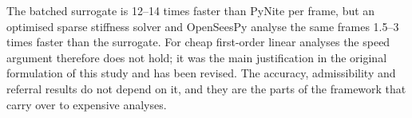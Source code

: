 The batched surrogate is 12--14 times faster than PyNite per frame, but an optimised sparse stiffness solver and OpenSeesPy analyse the same frames 1.5--3 times faster than the surrogate. For cheap first-order linear analyses the speed argument therefore does not hold; it was the main justification in the original formulation of this study and has been revised. The accuracy, admissibility and referral results do not depend on it, and they are the parts of the framework that carry over to expensive analyses.

